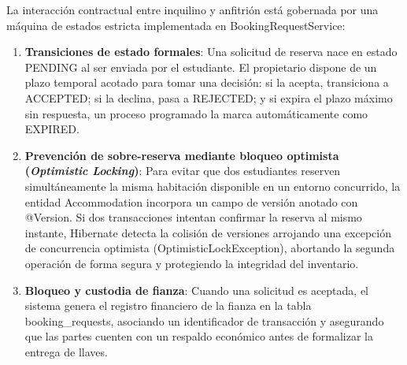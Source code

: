 La interacción contractual entre inquilino y anfitrión está gobernada por una máquina de estados estricta implementada en BookingRequestService:

\begin{enumerate}
    \item \textbf{Transiciones de estado formales}: Una solicitud de reserva nace en estado PENDING al ser enviada por el estudiante. El propietario dispone de un plazo temporal acotado para tomar una decisión: si la acepta, transiciona a ACCEPTED; si la declina, pasa a REJECTED; y si expira el plazo máximo sin respuesta, un proceso programado la marca automáticamente como EXPIRED.
    \item \textbf{Prevención de sobre-reserva mediante bloqueo optimista (\emph{Optimistic Locking})}: Para evitar que dos estudiantes reserven simultáneamente la misma habitación disponible en un entorno concurrido, la entidad Accommodation incorpora un campo de versión anotado con @Version. Si dos transacciones intentan confirmar la reserva al mismo instante, Hibernate detecta la colisión de versiones arrojando una excepción de concurrencia optimista (OptimisticLockException), abortando la segunda operación de forma segura y protegiendo la integridad del inventario.
    \item \textbf{Bloqueo y custodia de fianza}: Cuando una solicitud es aceptada, el sistema genera el registro financiero de la fianza en la tabla booking_requests, asociando un identificador de transacción y asegurando que las partes cuenten con un respaldo económico antes de formalizar la entrega de llaves.
\end{enumerate}


